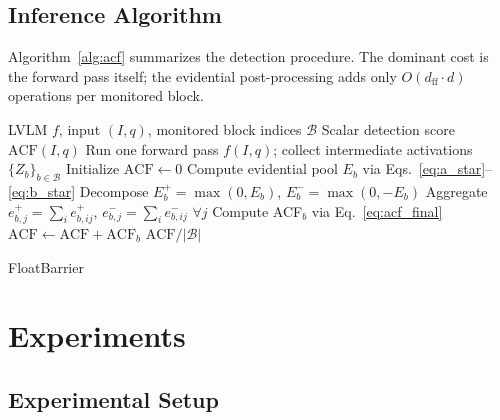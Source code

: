 \documentclass[preprint,12pt]{elsarticle}
\begin{document}
\subsection{Inference Algorithm}

Algorithm~\ref{alg:acf} summarizes the detection procedure. The dominant cost is the forward pass itself; the evidential post-processing adds only $O(d_{\text{ff}} \cdot d)$ operations per monitored block.

\begin{algorithm}[t]
\caption{Single-Pass ACF Detection}
\label{alg:acf}
\begin{algorithmic}[1]
\Require LVLM $f$, input $(I, q)$, monitored block indices $\mathcal{B}$
\Ensure Scalar detection score $\text{ACF}(I, q)$
\State Run one forward pass $f(I, q)$; collect intermediate activations $\{Z_b\}_{b \in \mathcal{B}}$
\State Initialize $\text{ACF} \gets 0$
    \State Compute evidential pool $E_b$ via Eqs.~\eqref{eq:a_star}--\eqref{eq:b_star}
    \State Decompose $E_b^+ = \max(0, E_b)$, $E_b^- = \max(0, -E_b)$
    \State Aggregate $e^+_{b,j} = \sum_i e^+_{b,ij}$, $e^-_{b,j} = \sum_i e^-_{b,ij}$ $\forall j$
    \State Compute ACF$_b$ via Eq.~\eqref{eq:acf_final}
    \State $\text{ACF} \gets \text{ACF} + \text{ACF}_b$
\EndFor
\State \Return $\text{ACF} / |\mathcal{B}|$
\end{algorithmic}
\end{algorithm}

FloatBarrier
\section{Experiments}

\subsection{Experimental Setup}
\label{sec:exp_setup}
\end{document}
